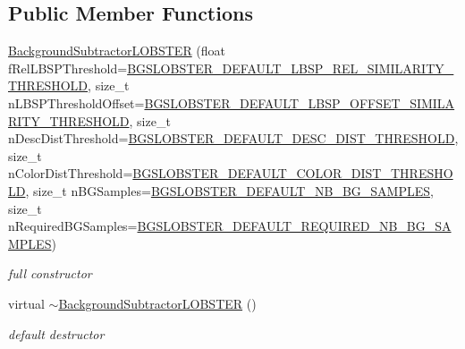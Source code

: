 \subsection*{Public Member Functions}
\begin{DoxyCompactItemize}
\item 
\mbox{\hyperlink{class_background_subtractor_l_o_b_s_t_e_r_a5a09b9ca80e50ba2f8686aaee6d461b7}{Background\+Subtractor\+L\+O\+B\+S\+T\+ER}} (float f\+Rel\+L\+B\+S\+P\+Threshold=\mbox{\hyperlink{_background_subtractor_l_o_b_s_t_e_r_8h_a3025dcc96b2d2c6416bfa57325d79ba5}{B\+G\+S\+L\+O\+B\+S\+T\+E\+R\+\_\+\+D\+E\+F\+A\+U\+L\+T\+\_\+\+L\+B\+S\+P\+\_\+\+R\+E\+L\+\_\+\+S\+I\+M\+I\+L\+A\+R\+I\+T\+Y\+\_\+\+T\+H\+R\+E\+S\+H\+O\+LD}}, size\+\_\+t n\+L\+B\+S\+P\+Threshold\+Offset=\mbox{\hyperlink{_background_subtractor_l_o_b_s_t_e_r_8h_a705c59e9c9a6fd8c0c57a5adab5a72c0}{B\+G\+S\+L\+O\+B\+S\+T\+E\+R\+\_\+\+D\+E\+F\+A\+U\+L\+T\+\_\+\+L\+B\+S\+P\+\_\+\+O\+F\+F\+S\+E\+T\+\_\+\+S\+I\+M\+I\+L\+A\+R\+I\+T\+Y\+\_\+\+T\+H\+R\+E\+S\+H\+O\+LD}}, size\+\_\+t n\+Desc\+Dist\+Threshold=\mbox{\hyperlink{_background_subtractor_l_o_b_s_t_e_r_8h_a11b89942e22902c0bbbbc2f0154804c2}{B\+G\+S\+L\+O\+B\+S\+T\+E\+R\+\_\+\+D\+E\+F\+A\+U\+L\+T\+\_\+\+D\+E\+S\+C\+\_\+\+D\+I\+S\+T\+\_\+\+T\+H\+R\+E\+S\+H\+O\+LD}}, size\+\_\+t n\+Color\+Dist\+Threshold=\mbox{\hyperlink{_background_subtractor_l_o_b_s_t_e_r_8h_a8442ce9b67919b77ad15847e5d80d983}{B\+G\+S\+L\+O\+B\+S\+T\+E\+R\+\_\+\+D\+E\+F\+A\+U\+L\+T\+\_\+\+C\+O\+L\+O\+R\+\_\+\+D\+I\+S\+T\+\_\+\+T\+H\+R\+E\+S\+H\+O\+LD}}, size\+\_\+t n\+B\+G\+Samples=\mbox{\hyperlink{_background_subtractor_l_o_b_s_t_e_r_8h_aea7261dd4c4233733b24fd175b6cb2b3}{B\+G\+S\+L\+O\+B\+S\+T\+E\+R\+\_\+\+D\+E\+F\+A\+U\+L\+T\+\_\+\+N\+B\+\_\+\+B\+G\+\_\+\+S\+A\+M\+P\+L\+ES}}, size\+\_\+t n\+Required\+B\+G\+Samples=\mbox{\hyperlink{_background_subtractor_l_o_b_s_t_e_r_8h_a209f60b8a126e31bb8ec6f8209d95ad0}{B\+G\+S\+L\+O\+B\+S\+T\+E\+R\+\_\+\+D\+E\+F\+A\+U\+L\+T\+\_\+\+R\+E\+Q\+U\+I\+R\+E\+D\+\_\+\+N\+B\+\_\+\+B\+G\+\_\+\+S\+A\+M\+P\+L\+ES}})
\begin{DoxyCompactList}\small\item\em full constructor \end{DoxyCompactList}\item 
virtual \mbox{\hyperlink{class_background_subtractor_l_o_b_s_t_e_r_a249ab359859ee9d439cd130d4271edd6}{$\sim$\+Background\+Subtractor\+L\+O\+B\+S\+T\+ER}} ()
\begin{DoxyCompactList}\small\item\em default destructor \end{DoxyCompactList}\item 

\end{DoxyCompactItemize}
